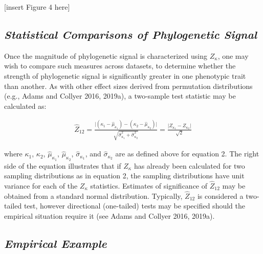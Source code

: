 \documentclass[]{article}
\begin{document}
{[}insert Figure 4 here{]}

\hypertarget{statistical-comparisons-of-phylogenetic-signal}{%
\subsection{\texorpdfstring{\emph{Statistical Comparisons of
Phylogenetic
Signal}}{Statistical Comparisons of Phylogenetic Signal}}\label{statistical-comparisons-of-phylogenetic-signal}}

Once the magnitude of phylogenetic signal is characterized using
\(Z_\kappa\), one may wish to compare such measures across datasets, to
determine whether the strength of phylogenetic signal is significantly
greater in one phenotypic trait than another. As with other effect sizes
derived from permutation distributions (e.g., Adams and Collyer 2016,
2019a), a two-sample test statistic may be calculated as:

\begin{align}
  \hat{Z}_{12}=\frac{\lvert{(\kappa_{1}-\hat\mu_{\kappa_1})-(\kappa_{2}-\hat\mu_{\kappa_2})}\rvert}{\sqrt{\hat\sigma^2_{\kappa_1}+\hat\sigma^2_{\kappa_2}}} = \frac{\lvert Z_{\kappa_1} - Z_{\kappa_2}\rvert}{\sqrt{2}}
\end{align}

where \(\kappa_1\), \(\kappa_2\), \(\hat\mu_{\kappa_1}\),
\(\hat\mu_{\kappa_2}\), \(\hat\sigma_{\kappa_1}\), and
\(\hat\sigma_{\kappa_2}\) are as defined above for equation 2. The right
side of the equation illustrates that if \(Z_\kappa\) has already been
calculated for two sampling distributions as in equation 2, the sampling
distributions have unit variance for each of the \(Z_\kappa\)
statistics. Estimates of significance of \(\hat{Z}_{12}\) may be
obtained from a standard normal distribution. Typically,
\(\hat{Z}_{12}\) is considered a two-tailed test, however directional
(one-tailed) tests may be specified should the empirical situation
require it (see Adams and Collyer 2016, 2019a). \hfill\break

\hypertarget{empirical-example}{%
\subsection{\texorpdfstring{\emph{Empirical
Example}}{Empirical Example}}\label{empirical-example}}
\end{document}
